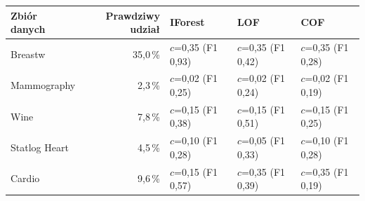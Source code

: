 \begin{tabular}{lrlll}
\toprule
Zbiór danych & Prawdziwy udział & IForest & LOF & COF \\
\midrule
Breastw & 35,0\,\% & $c$=0,35 (F1 0,93) & $c$=0,35 (F1 0,42) & $c$=0,35 (F1 0,28) \\
Mammography & 2,3\,\% & $c$=0,02 (F1 0,25) & $c$=0,02 (F1 0,24) & $c$=0,02 (F1 0,19) \\
Wine & 7,8\,\% & $c$=0,15 (F1 0,38) & $c$=0,15 (F1 0,51) & $c$=0,15 (F1 0,25) \\
Statlog Heart & 4,5\,\% & $c$=0,10 (F1 0,28) & $c$=0,05 (F1 0,33) & $c$=0,10 (F1 0,28) \\
Cardio & 9,6\,\% & $c$=0,15 (F1 0,57) & $c$=0,35 (F1 0,39) & $c$=0,35 (F1 0,19) \\
\bottomrule
\end{tabular}
